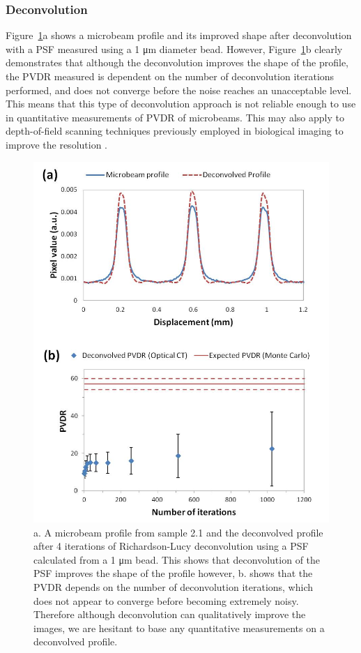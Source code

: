 	
	
	\subsubsection{Deconvolution}
	Figure~\ref{fig:Fig8}a shows a microbeam profile and its improved shape after deconvolution with a PSF measured using a 1 \si{\um} diameter bead. However, Figure~\ref{fig:Fig8}b clearly demonstrates that although the deconvolution improves the shape of the profile, the PVDR measured is dependent on the number of deconvolution iterations performed, and does not converge before the noise reaches an unacceptable level. This means that this type of deconvolution approach is not reliable enough to use in quantitative measurements of PVDR of microbeams. This may also apply to depth-of-field scanning techniques previously employed in biological imaging to improve the resolution \cite{fauverthree-dimensional2005}. 
	
	\begin{figure}
		\centering
		\includegraphics[width=0.9\linewidth]{mrt_img/mrt_Fig8}
		\caption{a. A microbeam profile from sample 2.1 and the deconvolved profile after 4 iterations of Richardson-Lucy deconvolution using a PSF calculated from a 1 \si{\um} bead. This shows that deconvolution of the PSF improves the shape of the profile however, b. shows that the PVDR depends on the number of deconvolution iterations, which does not appear to converge before becoming extremely noisy. Therefore although deconvolution can qualitatively improve the images, we are hesitant to base any quantitative measurements on a deconvolved profile.}
		\label{fig:Fig8}
	\end{figure}
	
